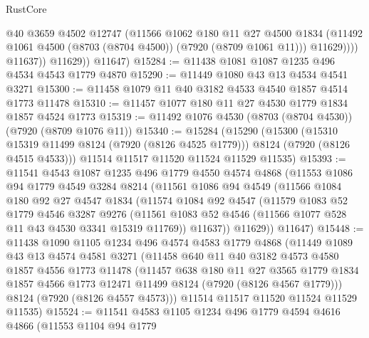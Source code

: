 \begin{lexlean}{RustCore}
\begin{coremodule}
                    @40
                    @3659
                    @4502
                    @12747
                    (@11566
                      @1062
                      @180
                      @11
                      @27
                      @4500
                      @1834
                      (@11492 @1061 @4500 (@8703 (@8704 @4500)) (@7920 (@8709 @1061 @11)))
                      @11629))))
              @11637))
          @11629))
      @11647)
@15284 := @11438 @1081 @1087 @1235 @496 @4534 @4543 @1779 @4870
@15290 := @11449 @1080 @43 @13 @4534 @4541 @3271
@15300 := @11458 @1079 @11 @40 @3182 @4533 @4540 @1857 @4514 @1773 @11478
@15310 := @11457 @1077 @180 @11 @27 @4530 @1779 @1834 @1857 @4524 @1773
@15319 := @11492 @1076 @4530 (@8703 (@8704 @4530)) (@7920 (@8709 @1076 @11))
@15340 := @15284
    (@15290
      (@15300
        (@15310 @15319 @11499 @8124 (@7920 (@8126 @4525 @1779)))
        @8124
        (@7920 (@8126 @4515 @4533)))
      @11514
      @11517
      @11520
      @11524
      @11529
      @11535)
@15393 := @11541
    @4543
    @1087
    @1235
    @496
    @1779
    @4550
    @4574
    @4868
    (@11553
      @1086
      @94
      @1779
      @4549
      @3284
      @8214
      (@11561
        @1086
        @94
        @4549
        (@11566
          @1084
          @180
          @92
          @27
          @4547
          @1834
          (@11574
            @1084
            @92
            @4547
            (@11579
              @1083
              @52
              @1779
              @4546
              @3287
              @9276
              (@11561 @1083 @52 @4546 (@11566 @1077 @528 @11 @43 @4530 @3341 @15319 @11769))
              @11637))
          @11629))
      @11647)
@15448 := @11438
    @1090
    @1105
    @1234
    @496
    @4574
    @4583
    @1779
    @4868
    (@11449
      @1089
      @43
      @13
      @4574
      @4581
      @3271
      (@11458
        @640
        @11
        @40
        @3182
        @4573
        @4580
        @1857
        @4556
        @1773
        @11478
        (@11457
          @638
          @180
          @11
          @27
          @3565
          @1779
          @1834
          @1857
          @4566
          @1773
          @12471
          @11499
          @8124
          (@7920 (@8126 @4567 @1779)))
        @8124
        (@7920 (@8126 @4557 @4573)))
      @11514
      @11517
      @11520
      @11524
      @11529
      @11535)
@15524 := @11541
    @4583
    @1105
    @1234
    @496
    @1779
    @4594
    @4616
    @4866
    (@11553
      @1104
      @94
      @1779

\end{coremodule}
\end{lexlean}
